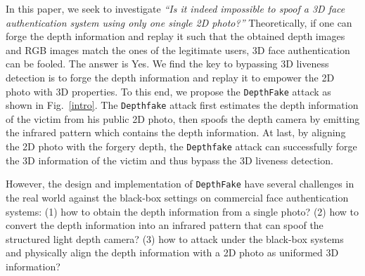 In this paper, we seek to investigate \emph{``Is it indeed impossible to spoof a 3D face authentication system using only one single 2D photo?''} Theoretically, if one can forge the depth information and replay it such that the obtained depth images and RGB images match the ones of the legitimate users, 3D face authentication can be fooled. %
The answer is Yes. We find the key to bypassing 3D liveness detection is to forge the depth information and replay it to empower the 2D photo with 3D properties. To this end, we propose the \texttt{DepthFake} attack as shown in Fig.~\ref{intro}. The \texttt{Depthfake} attack first estimates the depth information of the victim from his public 2D photo, then spoofs the depth camera by emitting the infrared pattern which contains the depth information. At last, by aligning the 2D photo with the forgery depth, the \texttt{Depthfake} attack can successfully forge the 3D information of the victim and thus bypass the 3D liveness detection.


However, the design and implementation of \texttt{DepthFake} have several challenges in the real world  against the black-box settings on commercial face authentication systems:
(1) how to obtain the depth information from a single photo?
(2) how to convert the depth information into an infrared pattern that can spoof the structured light depth camera?
(3) how to attack under the black-box systems and physically align the depth information with a 2D photo as uniformed 3D information? 


